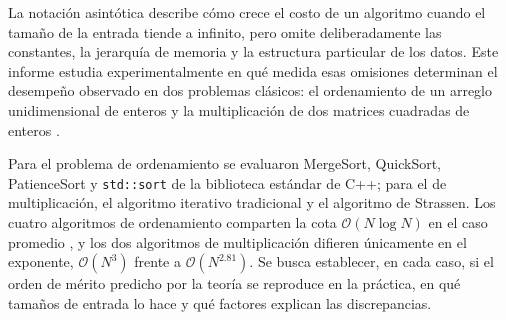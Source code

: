 La notación asintótica describe cómo crece el costo de un algoritmo cuando el tamaño de la entrada tiende a infinito, pero omite deliberadamente las constantes, la jerarquía de memoria y la estructura particular de los datos. Este informe estudia experimentalmente en qué medida esas omisiones determinan el desempeño observado en dos problemas clásicos: el ordenamiento de un arreglo unidimensional de enteros y la multiplicación de dos matrices cuadradas de enteros \cite{algorithms_erickson}.

Para el problema de ordenamiento se evaluaron MergeSort, QuickSort, PatienceSort y \texttt{std::sort} de la biblioteca estándar de C++; para el de multiplicación, el algoritmo iterativo tradicional y el algoritmo de Strassen. Los cuatro algoritmos de ordenamiento comparten la cota $\mathcal{O}(N \log N)$ en el caso promedio \cite{taocv3}, y los dos algoritmos de multiplicación difieren únicamente en el exponente, $\mathcal{O}(N^{3})$ frente a $\mathcal{O}(N^{2.81})$. Se busca establecer, en cada caso, si el orden de mérito predicho por la teoría se reproduce en la práctica, en qué tamaños de entrada lo hace y qué factores explican las discrepancias.
